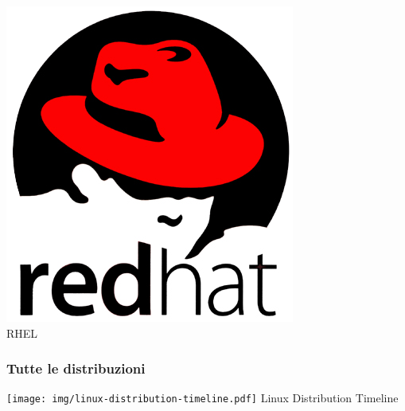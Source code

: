 \documentclass{beamer}
\begin{document}
\begin{frame}
\begin{minipage}[b][.35\textheight][t]{.3\textwidth}
    \includegraphics[width=.7\textwidth]{img/redhat.png}\\
    \centering
    RHEL
    \end{minipage}

\end{frame}

\begin{frame}
    \frametitle{Tutte le distribuzioni}

    \texttt{[image: img/linux-distribution-timeline.pdf]}
    \centering
    Linux Distribution Timeline
\end{frame}
\end{document}
